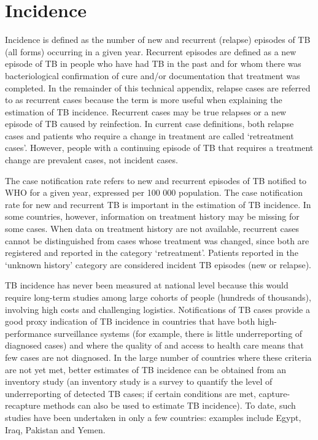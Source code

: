 \section{Incidence}

Incidence is defined as the number of new and recurrent (relapse) episodes of TB (all forms) occurring in a given year. Recurrent episodes are defined as a new episode of TB in people who have had TB in the past and for whom there was bacteriological confirmation of cure and/or documentation that treatment was completed. In the remainder of this technical appendix, relapse cases are referred to as recurrent cases because the term is more useful when explaining the estimation of TB incidence. Recurrent cases may be true relapses or a new episode of TB caused by reinfection. In current case definitions, both relapse cases and patients who require a change in treatment are called ‘retreatment cases’. However, people with a continuing episode of TB that requires a treatment change are prevalent cases, not incident cases. 

The case notification rate refers to new and recurrent episodes of TB notified to WHO for a given year, expressed per 100 000 population. The case notification rate for new and recurrent TB is important in the estimation of TB incidence. In some countries, however, information on treatment history may be missing for some cases. When data on treatment history are not available, recurrent cases cannot be distinguished from cases whose treatment was changed, since both are registered and reported in the category ‘retreatment’. Patients reported in the ‘unknown history’ category are considered incident TB episodes (new or relapse). 

TB incidence has never been measured at national level because this would require long-term studies among large cohorts of people (hundreds of thousands), involving high costs and challenging logistics. Notifications of TB cases provide a good proxy indication of TB incidence in countries that have both high-performance surveillance systems (for example, there is little underreporting of diagnosed cases) and where the quality of and access to health care means that few cases are not diagnosed. In the large number of countries where these criteria are not yet met, better estimates of TB incidence can be obtained from an inventory study\cite{WHO2012} (an inventory study is a survey to quantify the level of underreporting of detected TB cases; if certain conditions are met, capture-recapture methods can also be used to estimate TB incidence). To date, such studies have been undertaken in only a few countries: examples include Egypt, Iraq, Pakistan and Yemen. 

